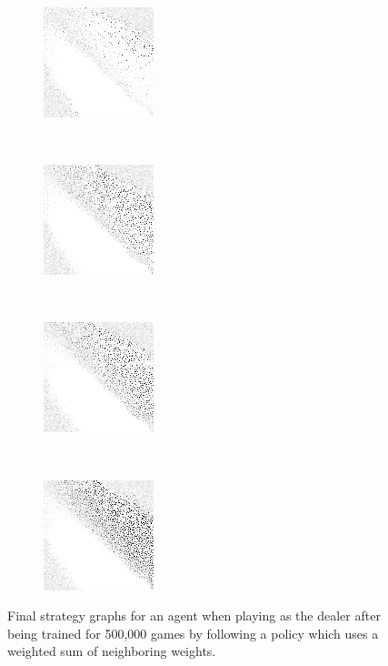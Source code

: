 \begin{figure}
	\begin{subfigure}[t]{0.22\textwidth}
		\center
		\includegraphics[width=\stratgraphwidth]{images/findings/experiments/neighbors/strats/crib_min_avg.png}
		\caption{\cribminavg}
	\end{subfigure}
	~
	\begin{subfigure}[t]{0.22\textwidth}
		\center
		\includegraphics[width=\stratgraphwidth]{images/findings/experiments/neighbors/strats/pegging_max_avg_gained.png}
		\caption{\peggingmaxavggained}
	\end{subfigure}
~
	\begin{subfigure}[t]{0.22\textwidth}
		\center
		\includegraphics[width=\stratgraphwidth]{images/findings/experiments/neighbors/strats/pegging_max_med_gained.png}
		\caption{\peggingmaxmedgained}
	\end{subfigure}
	~
	\begin{subfigure}[t]{0.22\textwidth}
		\center
		\includegraphics[width=\stratgraphwidth]{images/findings/experiments/neighbors/strats/pegging_min_avg_given.png}
		\caption{\peggingminavggiven}
	\end{subfigure}

\caption{
	Final strategy graphs for an agent when playing as the dealer
	after being trained for 500,000 games
	by following a policy which uses a weighted sum of neighboring weights.
}
\label{fig:neighbor-strats}
\end{figure}
